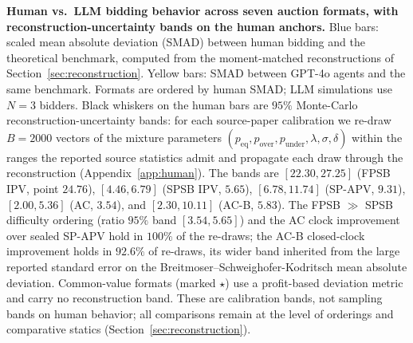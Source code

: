 
\caption{\textbf{Human vs.\ LLM bidding behavior across seven auction formats,
with reconstruction-uncertainty bands on the human anchors.}
Blue bars: scaled mean absolute deviation (SMAD) between human bidding and the
theoretical benchmark, computed from the moment-matched reconstructions of
Section~\ref{sec:reconstruction}. Yellow bars: SMAD between GPT-4o agents and the
same benchmark. Formats are ordered by human SMAD; LLM simulations use $N=3$
bidders. Black whiskers on the human bars are $95\%$ Monte-Carlo
reconstruction-uncertainty bands: for each source-paper calibration we re-draw
$B=2000$ vectors of the mixture parameters
$(p_{\text{eq}}, p_{\text{over}}, p_{\text{under}}, \lambda, \sigma, \delta)$
within the ranges the reported source statistics admit and propagate each draw
through the reconstruction (Appendix~\ref{app:human}). The bands are
$[22.30, 27.25]$ (FPSB IPV, point $24.76$), $[4.46, 6.79]$ (SPSB IPV, $5.65$),
$[6.78, 11.74]$ (SP-APV, $9.31$), $[2.00, 5.36]$ (AC, $3.54$), and
$[2.30, 10.11]$ (AC-B, $5.83$). The FPSB $\gg$ SPSB difficulty ordering
(ratio $95\%$ band $[3.54, 5.65]$) and the AC clock improvement over sealed SP-APV
hold in $100\%$ of the re-draws; the AC-B closed-clock improvement holds in
$92.6\%$ of re-draws, its wider band inherited from the large reported standard
error on the Breitmoser--Schweighofer-Kodritsch mean absolute deviation.
Common-value formats (marked $\star$) use a profit-based deviation metric and
carry no reconstruction band. These are calibration bands, not sampling bands on
human behavior; all comparisons remain at the level of orderings and
comparative statics (Section~\ref{sec:reconstruction}).}
